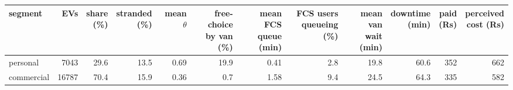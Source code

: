 \begin{tabular}{lrrrrrrrrrrr}\toprule
segment & EVs & \shortstack{share\\(\%)} & \shortstack{stranded\\(\%)} & \shortstack{mean\\$\theta$} & \shortstack{free-choice\\by van (\%)} & \shortstack{mean FCS\\queue (min)} & \shortstack{FCS users\\queueing (\%)} & \shortstack{mean van\\wait (min)} & \shortstack{downtime\\(min)} & \shortstack{paid\\(Rs)} & \shortstack{perceived\\cost (Rs)} \\ \midrule
personal & 7043 & 29.6 & 13.5 & 0.69 & 19.9 & 0.41 & 2.8 & 19.8 & 60.6 & 352 & 662 \\
commercial & 16787 & 70.4 & 15.9 & 0.36 & 0.7 & 1.58 & 9.4 & 24.5 & 64.3 & 335 & 582 \\
\bottomrule\end{tabular}
